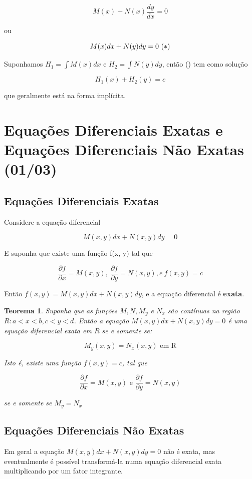 \documentclass{article}
\newtheorem{theorem}{Teorema}[section]
\begin{document}
$$M(x) + N(x) \dfrac{d y}{d x} = 0$$

ou

$$M(x) d x + N(y) d y = 0 \  (\text{\textasteriskcentered})$$

Suponhamos $H_1 = \int M(x) d x$ e $H_2 = \int N(y) d y$, então (\textasteriskcentered) tem como solução

$$H_1(x) + H_2 (y) = c$$

que geralmente está na forma implícita.

\section*{Equações Diferenciais Exatas e Equações Diferenciais Não Exatas (01/03)}
\label{s3}
\subsection*{Equações Diferenciais Exatas}
Considere a equação diferencial

$$M(x, y) d x + N(x, y) d y = 0$$

E suponha que existe uma função f(x, y) tal que 

$$\dfrac{\partial f}{\partial x} = M(x,y), \ \dfrac{\partial f}{\partial y} = N(x, y), e \ f(x, y) = c$$

Então $f(x, y) = M(x, y) d x + N(x, y) d y$, e a equação diferencial é \textbf{exata}.

\begin{theorem}
Suponha que as funções $M, N, M_y$ e $N_x$ são contínuas na região $R: a<x<b, c<y<d$. Então a equação $M(x, y) d x + N(x, y) d y = 0$ é uma equação diferencial exata em $R$ se e somente se:

$$M_y(x, y) = N_x(x, y) \text{ em R}$$

Isto é, existe uma função $f(x, y) = c$, tal que

$$\dfrac{\partial f}{\partial x} = M(x,y) \text{ e } \dfrac{\partial f}{\partial y} = N(x, y)$$

se e somente se $M_y = N_x$
\end{theorem}

\subsection*{Equações Diferenciais Não Exatas}
Em geral a equação $M(x, y) d x + N(x, y) d y = 0$ não é exata, mas eventualmente é possível transformá-la numa equação diferencial exata multiplicando por um fator integrante.
\end{document}
